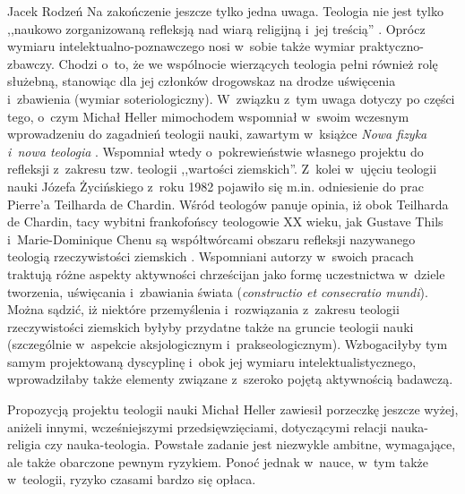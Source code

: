 \begin{newrevplenv}{Jacek Rodzeń}
Na zakończenie jeszcze tylko jedna uwaga. Teologia nie jest tylko ,,naukowo zorganizowaną refleksją nad wiarą religijną i~jej treścią''
\parencite[][s.~23]{heller_nauka_2019}. %
 Oprócz wymiaru intelektualno-poznawczego nosi w~sobie także wymiar praktyczno-zbawczy. Chodzi o~to, że we wspólnocie wierzących teologia pełni również rolę służebną, stanowiąc dla jej członków drogowskaz na drodze uświęcenia i~zbawienia (wymiar soteriologiczny). W~związku z~tym uwaga dotyczy po części tego, o~czym Michał Heller mimochodem wspomniał w~swoim wczesnym wprowadzeniu do zagadnień teologii nauki, zawartym w~książce \textit{Nowa fizyka i~nowa teologia} 
\parencite[][]{heller_nowa_1992}.%
 Wspomniał wtedy o~pokrewieństwie własnego projektu do refleksji z~zakresu tzw. teologii ,,wartości ziemskich''. Z~kolei w~ujęciu teologii nauki Józefa Życińskiego z~roku 1982 pojawiło się m.in. odniesienie do prac Pierre’a Teilharda de Chardin. Wśród teologów panuje opinia, iż obok Teilharda de Chardin, tacy wybitni frankofońscy teologowie XX wieku, jak Gustave Thils i~Marie-Dominique Chenu są współtwórcami obszaru refleksji nazywanego teologią rzeczywistości ziemskich 
\parencites[zob. np.][]{thils_theologie_1946}[][]{thils_theologie_1949}[][]{graczyk_francuska_1992}. %
 Wspomniani autorzy w~swoich pracach traktują różne aspekty aktywności chrześcijan jako formę uczestnictwa w~dziele tworzenia, uświęcania i~zbawiania świata (\textit{constructio et consecratio mundi}). Można sądzić, iż niektóre przemyślenia i~rozwiązania z~zakresu teologii rzeczywistości ziemskich byłyby przydatne także na gruncie teologii nauki (szczególnie w~aspekcie aksjologicznym i~prakseologicznym). Wzbogaciłyby tym samym projektowaną dyscyplinę i~obok jej wymiaru intelektualistycznego, wprowadziłaby także elementy związane z~szeroko pojętą aktywnością badawczą.

Propozycją projektu teologii nauki Michał Heller zawiesił porzeczkę jeszcze wyżej, aniżeli innymi, wcześniejszymi przedsięwzięciami, dotyczącymi relacji nauka-religia czy nauka-teologia. Powstałe zadanie jest niezwykle ambitne, wymagające, ale także obarczone pewnym ryzykiem. Ponoć jednak w~nauce, w~tym także w~teologii, ryzyko czasami bardzo się opłaca.




\vspace{5mm}%
\begin{flushright}
{\chaptitleeng\color{black!50}{Theology of science --~doomed to success?}}
\end{flushright}


\end{newrevplenv}
